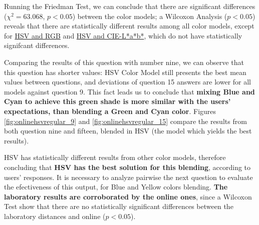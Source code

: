 %
Running the Friedman Test, we can conclude that there are significant differences ($\chi^2 = 63.068$, $p < 0.05$) between the color models; a Wilcoxon Analysis ($p < 0.05$) reveals that
there are statistically different results among all color models, except for \ul{HSV and RGB} and \ul{HSV and CIE-L*a*b*}, which do not have statistically signifcant differences. \par
%
Comparing the results of this question with number nine, we can observe that this question has shorter values: HSV Color Model still presents the best mean values between questions, and deviations of question 15
answers are lower for all models against question 9. This fact leads us to conclude that \textbf{mixing Blue and Cyan to achieve this green shade is more similar with the users' expectations, than blending a Green and
Cyan color}. Figures \ref{fig:onlinehsvregular_9} and \ref{fig:onlinehsvregular_15} compare the results from both question nine and fifteen, blended in HSV (the model which yields the best results). \par
%
HSV has statistically different results from other color models, therefore concluding that \textbf{HSV has the best solution for this blending}, according to users' responses. It is necessary to analyze
pairwise the next question to evaluate the efectiveness of this output, for Blue and Yellow colors blending. \textbf{The laboratory results are corroborated by the online ones}, since a Wilcoxon Test show that there
are no statistically significant differences between the laboratory distances and online ($p < 0.05$).\par
%
